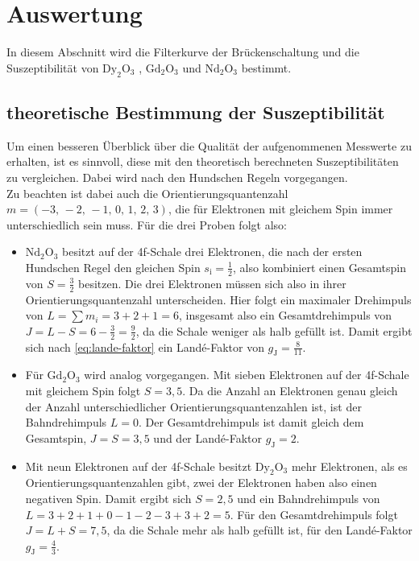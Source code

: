 \section{Auswertung}
\label{sec:Auswertung}
In diesem Abschnitt wird die Filterkurve der Brückenschaltung und die Suszeptibilität von $\text{Dy}_2\text{O}_3$ , $\text{Gd}_2\text{O}_3$ und  $\text{Nd}_2 \text{O}_3$ bestimmt.

\subsection{theoretische Bestimmung der Suszeptibilität}

Um einen besseren Überblick über die Qualität der aufgenommenen Messwerte zu erhalten, ist es sinnvoll, diese mit den theoretisch berechneten Suszeptibilitäten zu vergleichen.
Dabei wird nach den Hundschen Regeln vorgegangen. \\

Zu beachten ist dabei auch die Orientierungsquantenzahl $m = (-3, \,-2, \,-1, \,0, \,1, \,2, \,3)$, die für Elektronen mit gleichem Spin immer unterschiedlich sein muss.
Für die drei Proben folgt also:

\begin{itemize}
    \item $\text{Nd}_2 \text{O}_3$ besitzt auf der 4f-Schale drei Elektronen, die nach der ersten Hundschen Regel den gleichen Spin $s_\text{i} = \frac{1}{2}$, also kombiniert einen Gesamtspin von $S = \frac{3}{2}$ besitzen.
          Die drei Elektronen müssen sich also in ihrer Orientierungsquantenzahl unterscheiden. 
          Hier folgt ein maximaler Drehimpuls von $L = \sum m_i = 3 + 2 + 1 = 6$, insgesamt also ein Gesamtdrehimpuls von $J = L - S = 6 - \frac{3}{2} = \frac{9}{2}$,
          da die Schale weniger als halb gefüllt ist.
          Damit ergibt sich nach \eqref{eq:lande-faktor} ein Landé-Faktor von $g_\text{J} = \frac{8}{11}$.

    \item Für $\text{Gd}_2\text{O}_3$ wird analog vorgegangen. Mit sieben Elektronen auf der 4f-Schale mit gleichem Spin folgt $S = 3,5$. 
        Da die Anzahl an Elektronen genau gleich der Anzahl unterschiedlicher Orientierungsquantenzahlen ist, ist der Bahndrehimpuls $L = 0$.
        Der Gesamtdrehimpuls ist damit gleich dem Gesamtspin, $J = S = 3,5$ und der Landé-Faktor $g_\text{J} = 2$.

    \item Mit neun Elektronen auf der 4f-Schale besitzt $\text{Dy}_2\text{O}_3$ mehr Elektronen, als es Orientierungsquantenzahlen gibt, zwei der Elektronen haben also einen negativen Spin.
        Damit ergibt sich $S = 2,5$ und ein Bahndrehimpuls von \\ $L = 3 + 2 + 1 + 0 - 1 - 2 - 3 + 3 + 2 = 5$.
        Für den Gesamtdrehimpuls folgt $J = L + S = 7,5$, da die Schale mehr als halb gefüllt ist, für den Landé-Faktor $g_\text{J} = \frac{4}{3}$.
\end{itemize}

